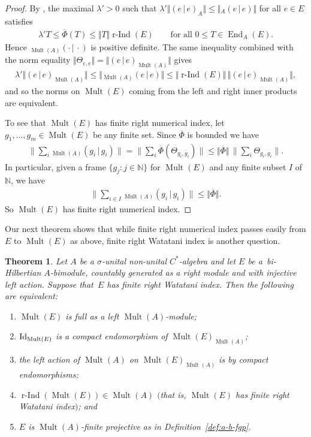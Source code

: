 \documentclass[10pt,a4paper]{amsart}
\numberwithin{equation}{section}
\newtheorem{thm}{Theorem}[section]
\DeclareMathOperator{\End}{End} %
\DeclareMathOperator{\Mult}{Mult} %
\newcommand{\rInd}{\operatorname{\mbox{$r$-$\operatorname{Ind}$}}}
\newcommand{\N}{\mathbb{N}} %
\newcommand{\ol}[1]{\overline{#1}} %
\begin{document}
\begin{proof}
By \cite[Proposition 2.27(1)]{KajPinWat}, the maximal $\lambda' > 0$ such that $\lambda'\Vert (e\,|\, e)_A\Vert\leq \Vert{}_A(e\,|\, e)\Vert$ for all $e\in E$ satisf\/ies
\begin{gather*}
\lambda'T\leq \ol{\Phi}(T)\leq \Vert T\Vert \rInd(E)\qquad\text{for all $0\leq T\in \End_A(E)$.} %
\end{gather*}
Hence ${_{\Mult(A)}(\cdot \,|\, \cdot)}$ is positive def\/inite. The same inequality combined with the norm equality $\Vert \Theta_{e,e}\Vert=\Vert (e\,|\, e)_{\Mult(A)}\Vert$ gives
\begin{gather*}
\lambda'\Vert (e\,|\, e)_{\Mult(A)}\Vert \leq\Vert {}_{\Mult(A)}(e\,|\, e)\Vert \leq \Vert \rInd(E)\Vert\,\Vert (e\,|\, e)_{\Mult(A)}\Vert,
\end{gather*}
and so the norms on $\Mult(E)$ coming from the left and right inner products are equivalent.

To see that $\Mult(E)$ has f\/inite right numerical index, let $g_1, \dots, g_m \in \Mult(E)$ be any f\/inite set. Since $\overline{\Phi}$ is bounded we have
\begin{gather*}
\textstyle \big\|\sum_i {_{\Mult(A)}(g_i \,|\, g_i)}\big\| = \big\|\sum_i \overline{\Phi}(\Theta_{g_i, g_i})\big\| \le \Vert\ol{\Phi}\Vert\, \big\|\sum_i \Theta_{g_i, g_i}\big\|.
\end{gather*}
In particular, given a frame $\{g_j \colon j \in \N\}$ for $\Mult(E)$ and any f\/inite subset
$I$ of $\N$, we have
\begin{gather*}\textstyle
\big\|\sum_{i\in I} {_{\Mult(A)}(g_i \,|\, g_i)}\big\| \leq \Vert\ol{\Phi}\Vert.
\end{gather*}
So $\Mult(E)$ has f\/inite right numerical index.
\end{proof}

Our next theorem shows that while f\/inite right numerical index passes easily from $E$ to $\Mult(E)$ as above, f\/inite right Watatani index is another question.

\begin{thm}\label{thm:TFAE} Let $A$ be a $\sigma$-unital non-unital $C^*$-algebra and let $E$ be a~bi-Hilbertian $A$-bi\-module, countably generated as a right module and with injective left action. Suppose that~$E$ has finite right Watatani index. Then the following are equivalent:
\begin{enumerate}\itemsep=0pt
\item[$1)$] $\Mult(E)$ is full as a left $\Mult(A)$-module;
\item[$2)$] ${\rm Id}_{\Mult(E)}$ is a compact endomorphism of $\Mult(E)_{\Mult(A)}$;
\item[$3)$] the left action of $\Mult(A)$ on $\Mult(E)_{\Mult(A)}$ is by compact endomorphisms;
\item[$4)$] $\rInd(\Mult(E))\in\Mult(A)$ $($that is, $\Mult(E)$ has finite right Watatani index$)$; and
\item[$5)$] $E$ is $\Mult(A)$-finite projective as in Definition~{\rm \ref{def:a-b-fgp}}.
\end{enumerate}
\end{thm}
\end{document}
